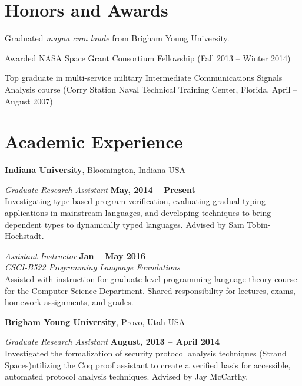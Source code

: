 \documentclass[margin,line]{res}
\begin{document}
\begin{resume}
\section{\sc Honors and Awards} 
Graduated \emph{magna cum laude} from Brigham Young University.

Awarded NASA Space Grant Consortium Fellowship (Fall 2013 -- Winter
2014)

Top graduate in multi-service military Intermediate Communications
Signals Analysis course (Corry Station Naval Technical Training
Center, Florida, April -- August 2007)

%

\section{\sc Academic Experience}
{\bf Indiana University}, Bloomington, Indiana USA

\vspace{-.3cm}
{\em Graduate Research Assistant} \hfill {\bf May, 2014 -- Present}\\
Investigating type-based program verification, evaluating gradual
typing applications in mainstream languages, and developing techniques
to bring dependent types to dynamically typed languages. Advised by
Sam Tobin-Hochstadt.


{\em Assistant Instructor} \hfill {\bf Jan -- May 2016}\\
{\em CSCI-B522 Programming Language Foundations}\\
Assisted with instruction for graduate level programming language
theory course for the Computer Science Department.  Shared
responsibility for lectures, exams, homework assignments, and grades.

{\bf Brigham Young University}, Provo, Utah USA

\vspace{-.3cm}

{\em Graduate Research Assistant} \hfill {\bf August, 2013 -- April 2014}\\
Investigated the formalization of security protocol analysis techniques
(Strand Spaces)utilizing the Coq proof assistant to create a verified
basis for accessible, automated protocol analysis techniques. Advised
by Jay McCarthy.


\end{resume}
\end{document}
